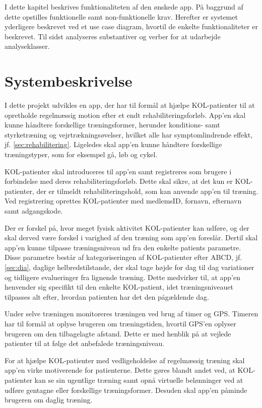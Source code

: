 I dette kapitel beskrives funktionaliteten af den ønskede app. På baggrund af dette opstilles funktionelle samt non-funktionelle krav. Herefter er systemet yderligere beskrevet ved et use case diagram, hvortil de enkelte funktionaliteter er beskrevet. Til sidst analyseres substantiver og verber for at udarbejde analyseklasser.  

\section{Systembeskrivelse} \label{sec:systembeskrivelse}
I dette projekt udvikles en app, der har til formål at hjælpe KOL-patienter til at opretholde regelmæssig motion efter et endt rehabiliteringsforløb. App'en skal kunne håndtere forskellige træningsformer, herunder konditions- samt styrketræning og vejrtrækningsøvelser, hvilket alle har symptomlindrende effekt, jf. \autoref{sec:rehabilitering}. Ligeledes skal app'en kunne håndtere forskellige træningstyper, som for eksempel gå, løb og cykel.

KOL-patienter skal introduceres til app'en samt registreres som brugere i forbindelse med deres rehabiliteringsforløb. 
Dette skal sikre, at det kun er KOL-patienter, der er tilmeldt rehabiliteringshold, som kan anvende app'en til træning. Ved registrering oprettes KOL-patienter med medlemsID, fornavn, efternavn samt adgangskode.  

Der er forskel på, hvor meget fysisk aktivitet KOL-patienter kan udføre, og der skal derved være forskel i varighed af den træning som app'en foreslår. Dertil skal app'en kunne tilpasse træningsniveau ud fra den enkelte patients parametre. Disse parametre består af kategoriseringen af KOL-patienter efter ABCD, jf. \autoref{sec:dia}, daglige helbredstilstande, der skal tage højde for dag til dag variationer og tidligere evalueringer fra lignende træning. Dette medvirker til, at app'en henvender sig specifikt til den enkelte KOL-patient, idet træningsniveauet tilpasses alt efter, hvordan patienten har det den pågældende dag.

Under selve træningen monitoreres træningen ved brug af timer og GPS. Timeren har til formål at oplyse brugeren om træningstiden, hvortil GPS'en oplyser brugeren om den tilbagelagte afstand. Dette er med henblik på at vejlede patienter til at følge det anbefalede træningsniveau. 

For at hjælpe KOL-patienter med vedligeholdelse af regelmæssig træning skal app’en virke motiverende for patienterne. Dette gøres blandt andet ved, at KOL-patienter kan se sin ugentlige træning samt opnå virtuelle belønninger ved at udføre gentagne eller forskellige træningsformer. Desuden skal app'en påminde brugeren om daglig træning.\citep{Gade2007, Tricomi2016}

